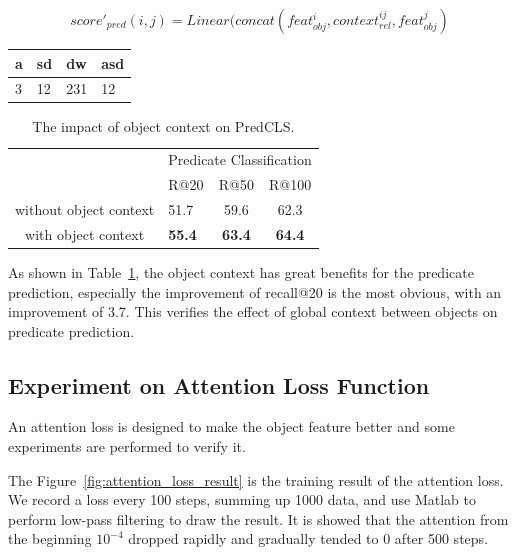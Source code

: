 \begin{equation}
	score'_{pred}(i,j) = Linear(concat(feat_{obj}^i, context_{rel}^{ij}, feat_{obj}^j)
	\label{equ:predicatd}
\end{equation}

\begin{table}[]
	\begin{tabular}{llll}
		\hline
		a & sd & dw  & asd \\ \hline
		3 & 12 & 231 & 12  \\ \hline
	\end{tabular}
\end{table}

\begin{table}[]
	\centering
	\begin{tabular}{c|lcc}
		\hline
		\multirow{2}{*}{}      & \multicolumn{3}{l}{Predicate Classification}  \\ \cline{2-4} 
		& R@20          & R@50          & R@100         \\ \hline
		without object context & 51.7          & 59.6          & 62.3          \\
		with object context    & \textbf{55.4} & \textbf{63.4} & \textbf{64.4} \\ \hline
	\end{tabular}
\caption[The impact of object context on PredCLS]{The impact of object context on PredCLS.}
\label{tab:object context}
\end{table}
As shown in Table~\ref{tab:object context}, the object context has great benefits for the predicate prediction, especially the improvement of recall@20 is the most obvious, with an improvement of 3.7. This verifies the effect of global context between objects on predicate prediction.%

\subsection{Experiment on Attention  Loss Function}

An attention loss is designed to make the object feature better and some experiments are performed to verify it.

The Figure~\ref{fig:attention_loss_result} is the training result of the attention loss. We record a loss every 100 steps, summing up 1000 data, and use Matlab to perform low-pass filtering to draw the result. It is showed that the attention from the beginning $ 10^{-4} $ dropped rapidly and gradually tended to 0 after 500 steps.

